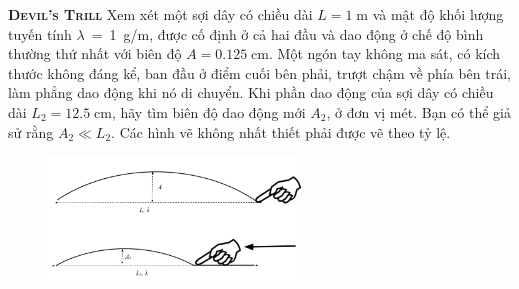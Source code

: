 




\begin{problem}{\textbf{\textsc{Devil's Trill}}}
	Xem xét một sợi dây có chiều dài $L=1\;\mathrm{m}$ và mật độ khối lượng tuyến tính $\lambda$\ =\ 1\ g/m, được cố định ở cả hai đầu và dao động ở chế độ bình thường thứ nhất với biên độ $A = 0.125 \; \mathrm{cm}$. Một ngón tay không ma sát, có kích thước không đáng kể, ban đầu ở điểm cuối bên phải, trượt chậm về phía bên trái, làm phẳng dao động khi nó di chuyển. Khi phần dao động của sợi dây có chiều dài $L_2=12.5\;\mathrm{cm}$, hãy tìm biên độ dao động mới $A_2$, ở đơn vị mét. Bạn có thể giả sử rằng $A_2\ll L_2$. Các hình vẽ không nhất thiết phải được vẽ theo tỷ lệ. 
	
	\FloatBarrier
	\begin{figure}[!htbp]
		\centering
		\includegraphics[width=0.6\textwidth]{problems/figures/devilTrill.png}
	\end{figure}
	\FloatBarrier
	
	
	
\end{problem}